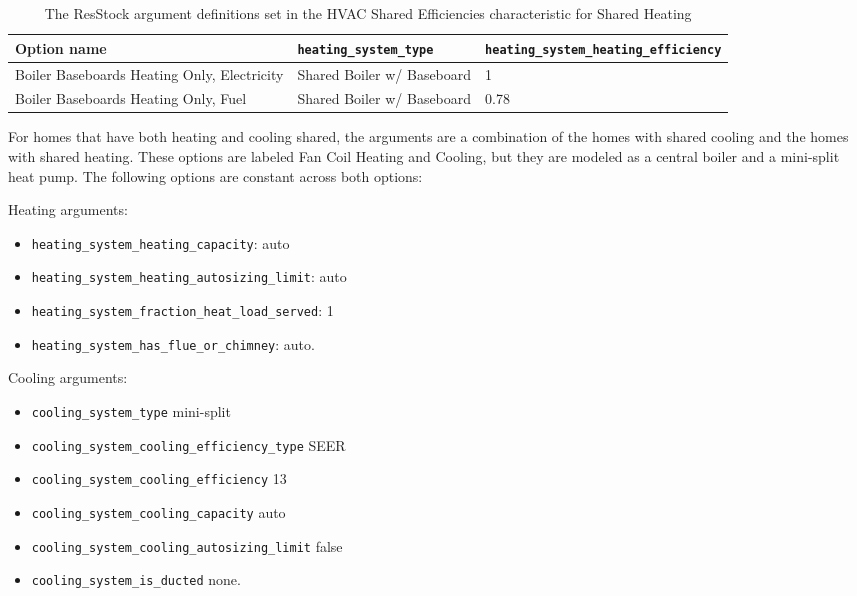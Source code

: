 \begin{longtable}[]{|p{3.5cm}|p{4cm}|p{3.5cm}|} 
\caption{The ResStock argument definitions set in the HVAC Shared Efficiencies characteristic for Shared Heating} \label{table:hc_arg_def_hvac_shared_eff_heat}\\
\toprule\noalign{}
Option name & \texttt{heating\_system\_type} &
\texttt{heating\_system\_heating\_efficiency} 
 \\
\midrule\noalign{}
\endhead
\bottomrule\noalign{}
\endlastfoot
Boiler Baseboards Heating Only, Electricity & Shared Boiler w/
Baseboard & 1   \\ 
\hline
Boiler Baseboards Heating Only, Fuel & Shared Boiler w/
Baseboard & 0.78 \\
\end{longtable}



For homes that have both heating and cooling shared, the arguments are a combination of the homes with shared cooling and the homes with shared heating. These options are labeled Fan Coil Heating and Cooling, but they are modeled as a central boiler and a mini-split heat pump. The following options are constant across both options:

Heating arguments:
\begin{itemize}
    \item \texttt{heating\_system\_heating\_capacity}: auto
    \item \texttt{heating\_system\_heating\_autosizing\_limit}: auto
    \item \texttt{heating\_system\_fraction\_heat\_load\_served}: 1
    \item \texttt{heating\_system\_has\_flue\_or\_chimney}: auto.
\end{itemize}

Cooling arguments:
\begin{itemize}
    \item \texttt{cooling\_system\_type} mini-split
    \item \texttt{cooling\_system\_cooling\_efficiency\_type} SEER
    \item \texttt{cooling\_system\_cooling\_efficiency} 13
    \item \texttt{cooling\_system\_cooling\_capacity} auto
    \item \texttt{cooling\_system\_cooling\_autosizing\_limit} false
    \item \texttt{cooling\_system\_is\_ducted} none.
\end{itemize}

